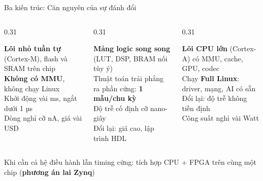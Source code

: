 \begin{frame}{Ba kiến trúc: Căn nguyên của sự đánh đổi}
\begin{columns}[T]
\begin{column}{0.31\linewidth}\centering
{}
\raggedright\MCU\par\smallskip\footnotesize
\textbf{Lõi nhỏ tuần tự} (Cortex-M), flash và SRAM trên chip\\
\textbf{Không có MMU}, không chạy Linux\\
Khởi động vài ms, ngắt dưới 1 µs\\
Dòng nghỉ cỡ nA, giá vài USD
\end{column}
\begin{column}{0.31\linewidth}\centering
{}
\raggedright\FPGA\par\smallskip\footnotesize
\textbf{Mảng logic song song} (LUT, DSP, BRAM nối tùy ý)\\
Thuật toán trải phẳng ra phần cứng: \textbf{1 mẫu/chu kỳ}\\
Độ trễ cố định cỡ nano-giây\\
Đổi lại: giá cao, lập trình HDL
\end{column}
\begin{column}{0.31\linewidth}\centering
{}
\raggedright\SoC\par\smallskip\footnotesize
\textbf{Lõi CPU lớn} (Cortex-A) có MMU, cache, GPU, codec\\
Chạy \textbf{Full Linux}: driver, mạng, AI có sẵn\\
Đổi lại: độ trễ không tiền định\\
Công suất nghỉ vài Watt
\end{column}
\end{columns}
\vfill
\centering\scriptsize\textcolor{cInk2}{Khi cần cả hệ điều hành lẫn timing cứng: tích hợp CPU + FPGA trên cùng một chip (\textbf{phương án lai Zynq})}
\end{frame}

